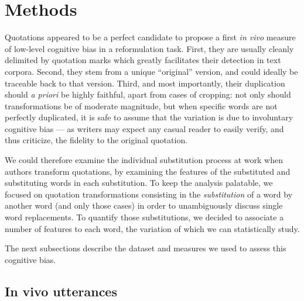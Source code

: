 \section{Methods} %
\label{sec:protocol}

Quotations appeared to be a perfect candidate to propose a first \emph{in vivo} measure of low-level cognitive bias in a reformulation task. %
First, they are usually cleanly delimited by quotation marks %
which greatly facilitates their detection in text corpora.
Second, they stem from a unique ``original'' version, and could ideally be traceable back to that version.
Third, and most importantly, their duplication should \emph{a priori} be highly faithful, apart from cases of cropping: not only should transformations be of moderate magnitude, but when specific words are not perfectly duplicated, it is safe to assume that the variation is due to involuntary cognitive bias --- as writers may expect any casual reader to easily verify, and thus criticize, the fidelity to the original quotation.


We could therefore examine the individual substitution process at work when authors transform quotations, by examining the features of the substituted and substituting words in each substitution. To keep the analysis palatable, we focused on quotation transformations consisting in the \emph{substitution} of a word by another word (and only those cases) in order to unambiguously discuss single word replacements. 
To quantify those substitutions, we decided to associate a number of features to each word, the variation of which we can statistically study.

The next subsections describe the dataset and measures we used to assess this cognitive bias.

\subsection{In vivo utterances}

